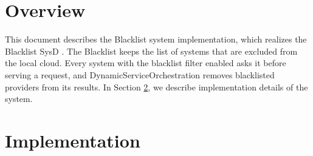 \documentclass[a4paper]{arrowhead}
\begin{document}
\sloppy

\ArrowheadSetup

\begin{center}
  \vspace*{1cm}
  \huge{\arrowtitle}

  \vspace*{0.2cm}
  \LARGE{\arrowtype}
  \vspace*{1cm}

  \vspace*{\fill}


  \vspace*{1cm}
  \vspace*{\fill}

  \begin{abstract}
    This document describes the design and implementation of the Blacklist support system of Arrowhead 5.2.2 (\texttt{ah5-Blacklist-java-spring}).
  \end{abstract}

  \vspace*{1cm}
\end{center}

\newpage

\tableofcontents
\newpage

\section{Overview}
\label{sec:overview}

This document describes the Blacklist system implementation, which realizes the Blacklist SysD \cite{bl-sysd}. The Blacklist keeps the list of systems that are excluded from the local cloud. Every system with the blacklist filter enabled asks it before serving a request, and Dynamic\allowbreak{}Service\allowbreak{}Orchestration removes blacklisted providers from its results.
In Section \ref{Implementation}, we describe implementation details of the system.

\newpage

\section{Implementation}
\label{Implementation}
\end{document}
